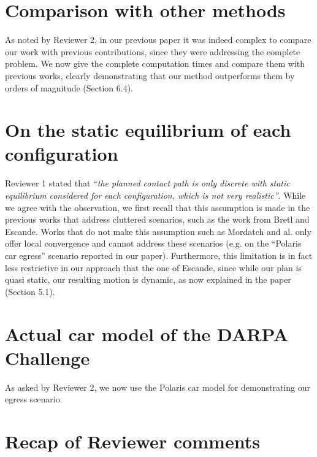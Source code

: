\documentclass[a4paper]{article}
\begin{document}
\section{Comparison with other methods}
As noted by Reviewer 2, in our previous paper it was indeed complex to compare our work with previous contributions,
since they were addressing the complete problem. We now give the complete computation times and compare them with previous works,
clearly demonstrating that our method outperforms them by orders of magnitude (Section 6.4).


\section{On the static equilibrium of each configuration}
Reviewer 1 stated that ``\textit{the planned contact path is only discrete with static equilibrium considered for each
configuration, which is not very realistic''}. While we agree with the observation, we first recall that this assumption is made in the previous works that address cluttered scenarios, such as the work from Bretl and Escande. Works that do not make this assumption such as Mordatch and al. only offer local convergence and cannot address these scenarios (e.g. on the ``Polaris car egress'' scenario reported in our paper). Furthermore, this limitation is in fact less restrictive in our approach that the one of Escande, since while our plan is quasi static, our resulting motion is dynamic, as now explained in the paper (Section 5.1). 

\section{Actual car model of the DARPA Challenge}
As asked by Reviewer 2, we now use the Polaris car model for demonstrating our egress scenario.

\newpage
\section{Recap of Reviewer comments}
\end{document}
